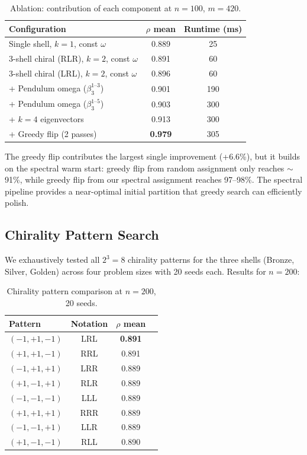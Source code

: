 \documentclass[11pt,a4paper]{article}
\begin{document}
\begin{table}[h]
\centering
\caption{Ablation: contribution of each component at $n=100$, $m=420$.}
\label{tab:ablation}
\begin{tabular}{@{}lcc@{}}
\toprule
Configuration & $\rho$ mean & Runtime (ms) \\
\midrule
Single shell, $k=1$, const $\omega$ & 0.889 & 25 \\
3-shell chiral (RLR), $k=2$, const $\omega$ & 0.891 & 60 \\
3-shell chiral (LRL), $k=2$, const $\omega$ & 0.896 & 60 \\
+ Pendulum omega ($\beta_3^{1\text{--}3}$) & 0.901 & 190 \\
+ Pendulum omega ($\beta_3^{1\text{--}5}$) & 0.903 & 300 \\
+ $k=4$ eigenvectors & 0.913 & 300 \\
+ Greedy flip (2 passes) & \textbf{0.979} & 305 \\
\bottomrule
\end{tabular}
\end{table}

The greedy flip contributes the largest single improvement (+6.6\%),
but it builds on the spectral warm start: greedy flip from random
assignment only reaches $\sim$91\%, while greedy flip from our spectral
assignment reaches 97--98\%. The spectral pipeline provides a
near-optimal initial partition that greedy search can efficiently polish.

\subsection{Chirality Pattern Search}

We exhaustively tested all $2^3 = 8$ chirality patterns for the
three shells (Bronze, Silver, Golden) across four problem sizes with
20 seeds each. Results for $n = 200$:

\begin{table}[h]
\centering
\caption{Chirality pattern comparison at $n=200$, 20 seeds.}
\label{tab:chirality}
\begin{tabular}{@{}lccc@{}}
\toprule
Pattern & Notation & $\rho$ mean \\
\midrule
$(-1, +1, -1)$ & LRL & \textbf{0.891} \\
$(+1, +1, -1)$ & RRL & 0.891 \\
$(-1, +1, +1)$ & LRR & 0.889 \\
$(+1, -1, +1)$ & RLR & 0.889 \\
$(-1, -1, -1)$ & LLL & 0.889 \\
$(+1, +1, +1)$ & RRR & 0.889 \\
$(-1, -1, +1)$ & LLR & 0.889 \\
$(+1, -1, -1)$ & RLL & 0.890 \\
\bottomrule
\end{tabular}
\end{table}
\end{document}
